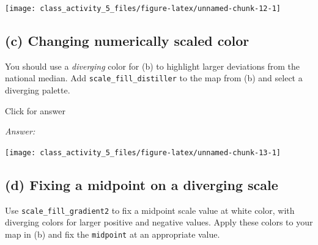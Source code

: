 \documentclass[
]{book}
\newenvironment{Shaded}{\begin{snugshade}}{\end{snugshade}}
\newcommand{\AttributeTok}[1]{\textcolor[rgb]{0.77,0.63,0.00}{#1}}
\newcommand{\CommentTok}[1]{\textcolor[rgb]{0.56,0.35,0.01}{\textit{#1}}}
\newcommand{\DecValTok}[1]{\textcolor[rgb]{0.00,0.00,0.81}{#1}}
\newcommand{\FunctionTok}[1]{\textcolor[rgb]{0.00,0.00,0.00}{#1}}
\newcommand{\NormalTok}[1]{#1}
\newcommand{\SpecialCharTok}[1]{\textcolor[rgb]{0.00,0.00,0.00}{#1}}
\newcommand{\StringTok}[1]{\textcolor[rgb]{0.31,0.60,0.02}{#1}}
\begin{document}
\texttt{[image: class\_activity\_5\_files/figure-latex/unnamed-chunk-12-1]}

\hypertarget{c-changing-numerically-scaled-color}{%
\subsection{(c) Changing numerically scaled color}\label{c-changing-numerically-scaled-color}}

You should use a \emph{diverging} color for (b) to highlight larger deviations from the national median. Add \texttt{scale\_fill\_distiller} to the map from (b) and select a diverging palette.

Click for answer

\emph{Answer:}

\begin{Shaded}
\end{Shaded}

\texttt{[image: class\_activity\_5\_files/figure-latex/unnamed-chunk-13-1]}

\hypertarget{d-fixing-a-midpoint-on-a-diverging-scale}{%
\subsection{(d) Fixing a midpoint on a diverging scale}\label{d-fixing-a-midpoint-on-a-diverging-scale}}

Use \texttt{scale\_fill\_gradient2} to fix a midpoint scale value at white color, with diverging colors for larger positive and negative values. Apply these colors to your map in (b) and fix the \texttt{midpoint} at an appropriate value.
\end{document}

